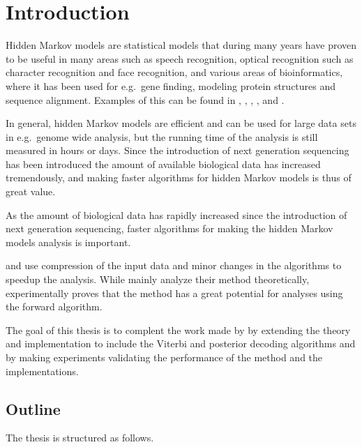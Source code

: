 \chapter{Introduction}

Hidden Markov models are statistical models that during many years have proven
to be useful in many areas such as speech recognition, optical recognition such
as character recognition and face recognition, and various areas of
bioinformatics, where it has been used for e.g.\ gene finding, modeling protein
structures and sequence alignment. Examples of this can be found in
\citet{rabiner1989tutorial}, \citet{agazzi1993hidden},
\citet{nefian1998hidden}, \citet{burge1997prediction}, and
\citet{eddy1998profile}.

In general, hidden Markov models are efficient and can be used for large data
sets in e.g.\ genome wide analysis, but the running time of the analysis is
still measured in hours or days. Since the introduction of next generation
sequencing has been introduced the amount of available biological data has
increased tremendously, and making faster algorithms for hidden Markov models
is thus of great value.

As the amount of biological data has
rapidly increased since the introduction of next generation sequencing, faster
algorithms for making the hidden Markov models analysis is important.

\citet{lifshits2009speeding} and \citet{sand2013ziphmmlib} use compression of
the input data and minor changes in the algorithms to speedup the
analysis. While \citet{lifshits2009speeding} mainly analyze their method
theoretically, \citet{sand2013ziphmmlib} experimentally proves that the method
has a great potential for analyses using the forward algorithm.

The goal of this thesis is to complent the work made by \citet{sand2013ziphmmlib}
by extending the theory and implementation to include the Viterbi and posterior decoding
algorithms and by making experiments validating the performance of the method
and the implementations.

\section{Outline}

The thesis is structured as follows.

